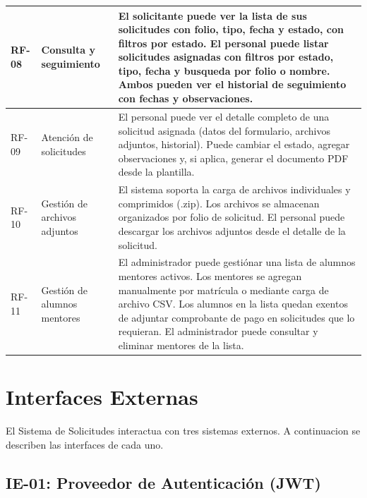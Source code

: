 \begin{longtable}{|C{1cm}|L{4.5cm}|L{8cm}|}
    \hline
    RF-08 & Consulta y seguimiento & El solicitante puede ver la lista de sus solicitudes con folio, tipo, fecha y estado, con filtros por estado. El personal puede listar solicitudes asignadas con filtros por estado, tipo, fecha y busqueda por folio o nombre. Ambos pueden ver el historial de seguimiento con fechas y observaciones. \\
    \hline
    RF-09 & Atención de solicitudes & El personal puede ver el detalle completo de una solicitud asignada (datos del formulario, archivos adjuntos, historial). Puede cambiar el estado, agregar observaciones y, si aplica, generar el documento PDF desde la plantilla. \\
    \hline
    RF-10 & Gestión de archivos adjuntos & El sistema soporta la carga de archivos individuales y comprimidos (.zip). Los archivos se almacenan organizados por folio de solicitud. El personal puede descargar los archivos adjuntos desde el detalle de la solicitud. \\
    \hline
    RF-11 & Gestión de alumnos mentores & El administrador puede gestiónar una lista de alumnos mentores activos. Los mentores se agregan manualmente por matrícula o mediante carga de archivo CSV. Los alumnos en la lista quedan exentos de adjuntar comprobante de pago en solicitudes que lo requieran. El administrador puede consultar y eliminar mentores de la lista. \\
    \hline
\end{longtable}

\section{Interfaces Externas}

El Sistema de Solicitudes interactua con tres sistemas externos. A continuacion se describen las interfaces de cada uno.

\subsection{IE-01: Proveedor de Autenticación (JWT)}

